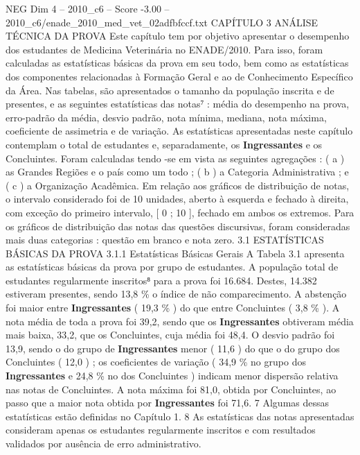 \begin{textsample}{NEG Dim 4 – 2010\_c6 – Score -3.00 – 2010\_c6/enade\_2010\_med\_vet\_02adfbfccf.txt}  \label{ex:f4_neg_041}
CAPÍTULO 3 ANÁLISE TÉCNICA DA PROVA Este capítulo tem por objetivo apresentar o desempenho dos estudantes de Medicina Veterinária no ENADE/2010.
Para isso, foram calculadas as estatísticas básicas da prova em seu todo, bem como as estatísticas dos componentes relacionadas à Formação Geral e ao de Conhecimento Específico da Área.
Nas tabelas, são apresentados o tamanho da população inscrita e de presentes, e as seguintes estatísticas das notas⁷ : média do desempenho na prova, erro-padrão da média, desvio padrão, nota mínima, mediana, nota máxima, coeficiente de assimetria e de variação.
As estatísticas apresentadas neste capítulo contemplam o total de estudantes e, separadamente, os \textbf{Ingressantes} e os Concluintes.
Foram calculadas tendo -se em vista as seguintes agregações : ( a ) as Grandes Regiões e o país como um todo ; ( b ) a Categoria Administrativa ; e ( c ) a Organização Acadêmica.
Em relação aos gráficos de distribuição de notas, o intervalo considerado foi de 10 unidades, aberto à esquerda e fechado à direita, com exceção do primeiro intervalo, [ 0 ; 10 ], fechado em ambos os extremos.
Para os gráficos de distribuição das notas das questões discursivas, foram consideradas mais duas categorias : questão em branco e nota zero. 3.1 ESTATÍSTICAS BÁSICAS DA PROVA 3.1.1 Estatísticas Básicas Gerais A Tabela 3.1 apresenta as estatísticas básicas da prova por grupo de estudantes.
A população total de estudantes regularmente inscritos⁸ para a prova foi 16.684.
Destes, 14.382 estiveram presentes, sendo 13,8 \% o índice de não comparecimento.
A abstenção foi maior entre \textbf{Ingressantes} ( 19,3 \% ) do que entre Concluintes ( 3,8 \% ).
A nota média de toda a prova foi 39,2, sendo que os \textbf{Ingressantes} obtiveram média mais baixa, 33,2, que os Concluintes, cuja média foi 48,4.
O desvio padrão foi 13,9, sendo o do grupo de \textbf{Ingressantes} menor ( 11,6 ) do que o do grupo dos Concluintes ( 12,0 ) ; os coeficientes de variação ( 34,9 \% no grupo dos \textbf{Ingressantes} e 24,8 \% no dos Concluintes ) indicam menor dispersão relativa nas notas de Concluintes.
A nota máxima foi 81,0, obtida por Concluintes, ao passo que a maior nota obtida por \textbf{Ingressantes} foi 71,6. 7 Algumas dessas estatísticas estão definidas no Capítulo 1. 8 As estatísticas das notas apresentadas consideram apenas os estudantes regularmente inscritos e com resultados validados por ausência de erro administrativo.

\end{textsample}
